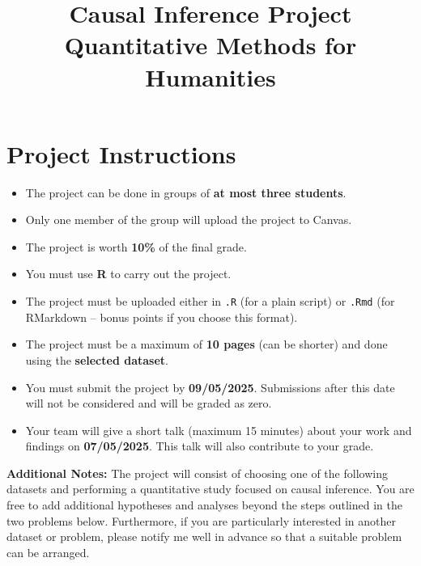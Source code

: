 \documentclass[12pt]{article}
\title{Causal Inference Project \\ Quantitative Methods for Humanities}
\author{}
\date{}
\begin{document}
\maketitle

\section*{Project Instructions}
\begin{itemize}
    \item The project can be done in groups of \textbf{at most three students}.
    \item Only one member of the group will upload the project to Canvas.
    \item The project is worth \textbf{10\%} of the final grade.
    \item You must use \textbf{R} to carry out the project.
    \item The project must be uploaded either in \texttt{.R} (for a plain script) or \texttt{.Rmd} (for RMarkdown -- bonus points if you choose this format).
    \item The project must be a maximum of \textbf{10 pages} (can be shorter) and done using the \textbf{selected dataset}.
    \item You must submit the project by \textbf{09/05/2025}. Submissions after this date will not be considered and will be graded as zero.
    \item Your team will give a short talk (maximum 15 minutes) about your work and findings on \textbf{07/05/2025}. This talk will also contribute to your grade.
\end{itemize}
\vspace{0.1cm}

\noindent\textbf{Additional Notes:}  
The project will consist of choosing one of the following datasets and performing a quantitative study focused on causal inference. You are free to add additional hypotheses and analyses beyond the steps outlined in the two problems below. Furthermore, if you are particularly interested in another dataset or problem, please notify me well in advance so that a suitable problem can be arranged.
\vspace{0.2cm}
\end{document}
